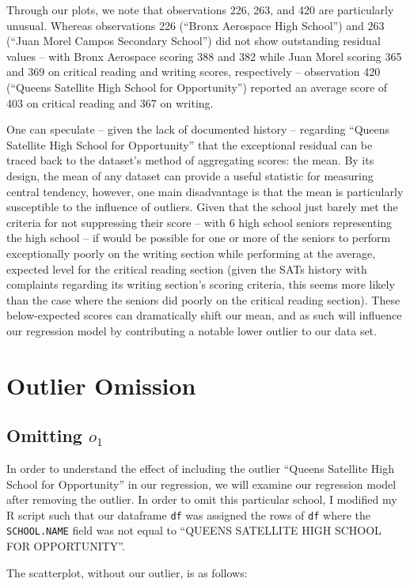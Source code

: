 \documentclass[11pt]{article} %
\begin{document}
\newpage

Through our plots, we note that observations 226, 263, and 420 are particularly unusual. Whereas observations 226 (``Bronx Aerospace High School'') and 263 (``Juan Morel Campos Secondary School'') did not show outstanding residual values -- with Bronx Aerospace scoring 388 and 382 while Juan Morel scoring 365 and 369 on critical reading and writing scores, respectively -- observation 420 (``Queens Satellite High School for Opportunity'') reported an average score of 403 on critical reading and 367 on writing. \par
One can speculate -- given the lack of documented history -- regarding ``Queens Satellite High School for Opportunity'' that the exceptional residual can be traced back to the dataset's method of aggregating scores: the mean. By its design, the mean of any dataset can provide a useful statistic for measuring central tendency, however, one main disadvantage is that the mean is particularly susceptible to the influence of outliers. Given that the school just barely met the criteria for not suppressing their score -- with 6 high school seniors representing the high school -- if would be possible for one or more of the seniors to perform exceptionally poorly on the writing section while performing at the average, expected level for the critical reading section (given the SATs history with complaints regarding its writing section's scoring criteria, this seems more likely than the case where the seniors did poorly on the critical reading section). These below-expected scores can dramatically shift our mean, and as such will influence our regression model by contributing a notable lower outlier to our data set.

\section*{Outlier Omission}
\subsection*{Omitting $o_1$}
In order to understand the effect of including the outlier ``Queens Satellite High School for Opportunity'' in our regression, we will examine our regression model after removing the outlier. In order to omit this particular school, I modified my \textsc{R} script such that our dataframe \texttt{df} was assigned the rows of \texttt{df} where the \texttt{SCHOOL.NAME} field was not equal to ``QUEENS SATELLITE HIGH SCHOOL FOR OPPORTUNITY''. \par
The scatterplot, without our outlier, is as follows:
\end{document}
